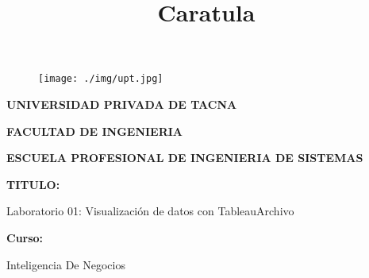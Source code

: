 \documentclass[12pt,letterpaper]{article}
\begin{document}
%

  
\title{Caratula}

\begin{titlepage}
    \begin{center}
    \begin{figure}[htb]
    \begin{center}
    \texttt{[image: ./img/upt.jpg]}
    \end{center}
    \end{figure}
    
    \vspace*{0.15in}
    \begin{Large}
    \textbf{UNIVERSIDAD PRIVADA DE TACNA}\\
    \end{Large}
    
    \vspace*{0.1in}
    \begin{Large}
    \textbf{FACULTAD DE INGENIERIA} \\
    \end{Large}
    
    \vspace*{0.1in}
    \begin{Large}
    \textbf{ESCUELA PROFESIONAL DE INGENIERIA DE SISTEMAS} \\
    \end{Large}
    
    \vspace*{0.5in}
    \begin{Large}
    \textbf{TITULO:}\\
    \end{Large}
    

\vspace*{0.1in}
\begin{Large}
    Laboratorio 01: Visualización de datos con TableauArchivo \\
\end{Large}

\vspace*{0.3in}
\begin{Large}
\textbf{Curso:} \\
\end{Large}

\vspace*{0.1in}
\begin{large}
    Inteligencia De Negocios\\
\end{large}


\end{center}
\end{titlepage}
\end{document}
